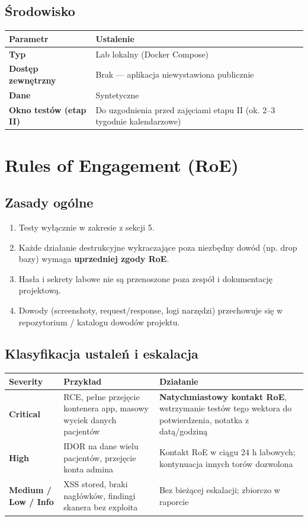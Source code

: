 \documentclass[11pt,a4paper]{article}
\begin{document}
\subsection{Środowisko}

\begin{tabularx}{\textwidth}{@{}>{\bfseries}l L@{}}
\toprule
\normalfont\textbf{Parametr} & \textbf{Ustalenie} \\
\midrule
Typ & Lab lokalny (Docker Compose) \\
Dostęp zewnętrzny & Brak — aplikacja niewystawiona publicznie \\
Dane & Syntetyczne \\
Okno testów (etap II) & Do uzgodnienia przed zajęciami etapu II (ok. 2–3 tygodnie kalendarzowe) \\
\bottomrule
\end{tabularx}

\section{Rules of Engagement (RoE)}

\subsection{Zasady ogólne}
\begin{enumerate}[leftmargin=*]
  \item Testy wyłącznie w zakresie z sekcji 5.
  \item Każde działanie destrukcyjne wykraczające poza niezbędny dowód (np. drop bazy) wymaga \textbf{uprzedniej zgody RoE}.
  \item Hasła i sekrety labowe nie są przenoszone poza zespół i dokumentację projektową.
  \item Dowody (screenshoty, request/response, logi narzędzi) przechowuje się w repozytorium / katalogu dowodów projektu.
\end{enumerate}

\subsection{Klasyfikacja ustaleń i eskalacja}

\begin{tabularx}{\textwidth}{@{}>{\bfseries}l L L@{}}
\toprule
\normalfont\textbf{Severity} & \textbf{Przykład} & \textbf{Działanie} \\
\midrule
\textcolor{crit}{Critical} & RCE, pełne przejęcie kontenera app, masowy wyciek danych pacjentów & \textbf{Natychmiastowy kontakt RoE}, wstrzymanie testów tego wektora do potwierdzenia, notatka z datą/godziną \\
\textcolor{high}{High} & IDOR na dane wielu pacjentów, przejęcie konta admina & Kontakt RoE w ciągu 24 h labowych; kontynuacja innych torów dozwolona \\
\textcolor{med}{Medium / Low / Info} & XSS stored, braki nagłówków, findingi skanera bez exploita & Bez bieżącej eskalacji; zbiorczo w raporcie \\
\bottomrule
\end{tabularx}
\end{document}
